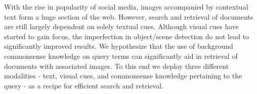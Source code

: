 With the rise in popularity of social media, images accompanied by contextual text form a huge section of the web. However, search and retrieval of documents are still largely dependent on solely textual cues. Although visual cues have started to gain focus, the imperfection in object/scene detection do not lead to significantly improved results. We hypothesize that the use of background commonsense knowledge on query terms can significantly aid in retrieval of documents with associated images. To this end we deploy three different modalities - text, visual cues, and commonsense knowledge pertaining to the query - as a recipe for efficient search and retrieval.
